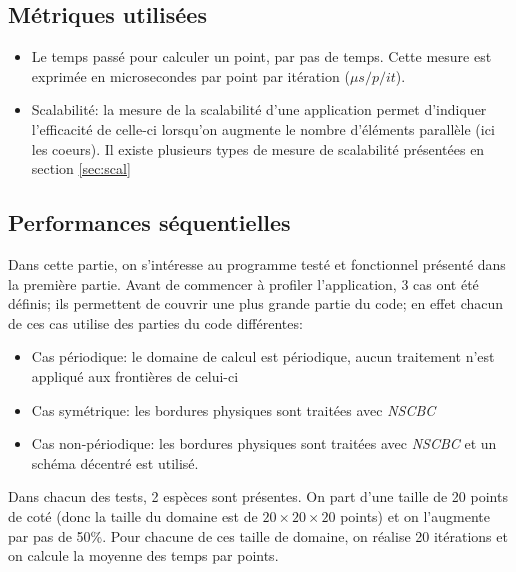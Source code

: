 \subsection{Métriques utilisées}
\begin{itemize}
\item Le temps passé pour calculer un point, par pas de temps. Cette mesure est exprimée en microsecondes par point par itération ($\mu s/p/it$).

\item Scalabilité: la mesure de la scalabilité d'une application permet d'indiquer l'efficacité de celle-ci lorsqu'on augmente le nombre d'éléments parallèle (ici les coeurs). Il existe plusieurs types de mesure de scalabilité présentées en section \ref{sec:scal}



\end{itemize}




\subsection{Performances séquentielles}
Dans cette partie, on s'intéresse au programme testé et fonctionnel présenté dans la première partie. Avant de commencer à profiler l'application, 3 cas ont été définis; ils permettent de couvrir une plus grande partie du code; en effet chacun de ces cas utilise des parties du code différentes:

\begin{itemize}
\item Cas périodique: le domaine de calcul est périodique, aucun traitement n'est appliqué aux frontières de celui-ci
\item Cas symétrique: les bordures physiques sont traitées avec \textit{NSCBC} 
\item Cas non-périodique: les bordures physiques sont traitées avec \textit{NSCBC} et un schéma décentré est utilisé.
\end{itemize}


Dans chacun des tests, 2 espèces sont présentes. On part d'une taille de 20 points de coté (donc la taille du domaine est de $20\times20\times20$ points) et on l'augmente par pas de 50\%. Pour chacune de ces taille de domaine, on réalise 20 itérations et on calcule la moyenne des temps par points.

